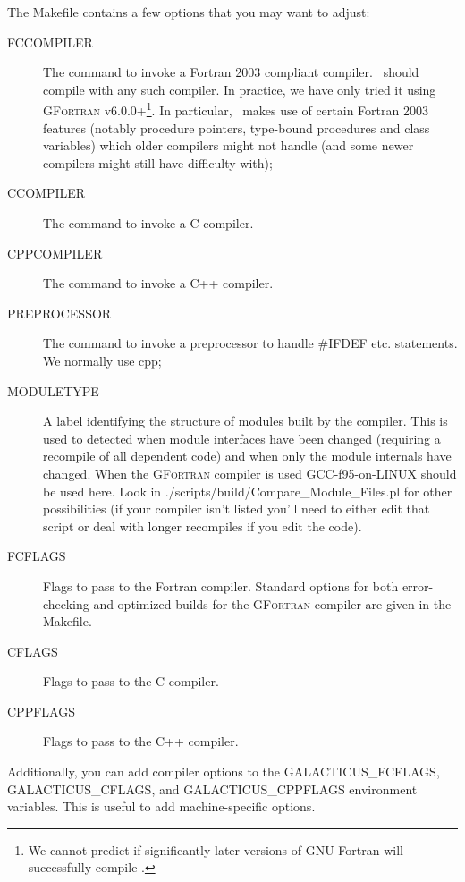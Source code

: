 The {\normalfont \ttfamily Makefile} contains a few options that you may want to adjust:
\begin{description}
 \item[{\normalfont \ttfamily FCCOMPILER}] The command to invoke a Fortran 2003 compliant compiler. \glc\ should compile with any such compiler. In practice, we have only tried it using {\normalfont \scshape GFortran} v6.0.0+\footnote{We cannot predict if significantly later versions of GNU Fortran will successfully compile \protect\glc.}. In particular, \glc\ makes use of certain Fortran 2003 features (notably procedure pointers, type-bound procedures and class variables) which older compilers might not handle (and some newer compilers might still have difficulty with);
 \item[{\normalfont \ttfamily CCOMPILER}] The command to invoke a C compiler.
 \item[{\normalfont \ttfamily CPPCOMPILER}] The command to invoke a C++ compiler.
 \item[{\normalfont \ttfamily PREPROCESSOR}] The command to invoke a preprocessor to handle {\normalfont \ttfamily \#IFDEF} etc. statements. We normally use {\normalfont \ttfamily cpp};
 \item[{\normalfont \ttfamily MODULETYPE}] A label identifying the structure of modules built by the compiler. This is used to detected when module interfaces have been changed (requiring a recompile of all dependent code) and when only the module internals have changed. When the {\normalfont \scshape GFortran} compiler is used {\normalfont \ttfamily GCC-f95-on-LINUX} should be used here. Look in {\normalfont \ttfamily ./scripts/build/Compare\_Module\_Files.pl} for other possibilities (if your compiler isn't listed you'll need to either edit that script or deal with longer recompiles if you edit the code).
 \item[{\normalfont \ttfamily FCFLAGS}] Flags to pass to the Fortran compiler. Standard options for both error-checking and optimized builds for the {\normalfont \scshape GFortran} compiler are given in the {\normalfont \ttfamily Makefile}.
 \item[{\normalfont \ttfamily CFLAGS}] Flags to pass to the C compiler.
 \item[{\normalfont \ttfamily CPPFLAGS}] Flags to pass to the C++ compiler.
\end{description}
Additionally, you can add compiler options to the {\normalfont \ttfamily GALACTICUS\_FCFLAGS}, {\normalfont \ttfamily GALACTICUS\_CFLAGS}, and {\normalfont \ttfamily GALACTICUS\_CPPFLAGS} environment variables. This is useful to add machine-specific options.

